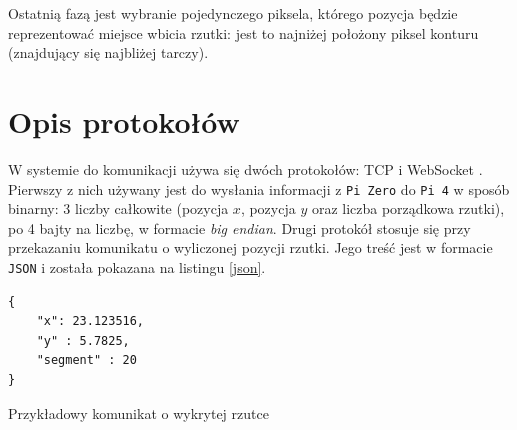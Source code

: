 Ostatnią fazą jest wybranie pojedynczego piksela, którego pozycja będzie reprezentować miejsce wbicia rzutki: jest to najniżej położony piksel konturu (znajdujący się najbliżej tarczy).

\section{Opis protokołów}
W systemie do komunikacji używa się dwóch protokołów: TCP \cite{TCP} i WebSocket \cite{WebSocket}. Pierwszy z nich używany jest do wysłania informacji z \verb|Pi Zero| do \verb|Pi 4| w sposób binarny: 3 liczby całkowite (pozycja $x$, pozycja $y$ oraz liczba porządkowa rzutki), po 4 bajty na liczbę, w formacie \textit{big endian}. Drugi protokół stosuje się przy przekazaniu komunikatu o wyliczonej pozycji rzutki. Jego treść jest w formacie \verb|JSON| i została pokazana na listingu \ref{json}. 

\begin{listing}[h!]
\begin{verbatim}
{     
    "x": 23.123516,
    "y" : 5.7825,
    "segment" : 20
}
\end{verbatim}
\caption{Przykładowy komunikat o wykrytej rzutce} 
\label{json}
\end{listing}